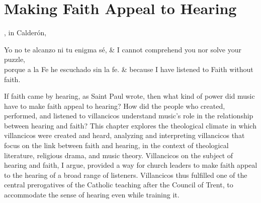 
% 
% 
% 


\chapter{Making Faith Appeal to Hearing}
\label{ch:faith-hearing}

\begin{epigraph}{, in Calderón, 
    \Autocite[l. 1327]{Calderon:Retiro}} %
    \begin{quotepoem}
        Yo no te alcanzo ni tu enigma sé, 
        & I cannot comprehend you nor solve your puzzle, \\

        porque a la Fe he escuchado sin la fe. 
        & because I have listened to Faith without faith.
    \end{quotepoem}
\end{epigraph}

If faith came by hearing, as Saint Paul wrote, then what kind of power did music
have to make faith appeal to hearing? 
How did the people who created, performed, and listened to villancicos
understand music's role in the relationship between hearing and faith?
This chapter explores the theological climate in which villancicos were created
and heard, analyzing and interpreting villancicos that focus on the link between
faith and hearing, in the context of theological literature, religious drama,
and music theory.
Villancicos on the subject of hearing and faith, I argue, provided a way for
church leaders to make faith appeal to the hearing of a broad range of
listeners.  
Villancicos thus fulfilled one of the central prerogatives of the Catholic
teaching after the Council of Trent, to accommodate the sense of
hearing even while training it.


